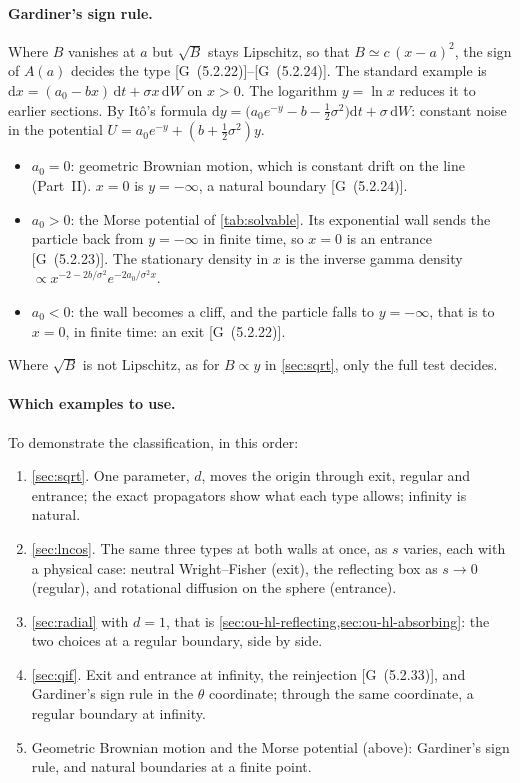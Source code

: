 \documentclass[11pt]{article}
\numberwithin{equation}{section}
\newcommand{\dd}{\mathrm{d}}
\newcommand{\G}[1]{[G~(#1)]}
\begin{document}
\paragraph{Gardiner's sign rule.} Where $B$ vanishes at $a$ but $\sqrt B$ stays Lipschitz, so that
$B\simeq c\,(x-a)^2$, the sign of $A(a)$ decides the type \G{5.2.22}--\G{5.2.24}. The standard example is
$\dd x=(a_0-bx)\,\dd t+\sigma x\,\dd W$ on $x>0$. The logarithm $y=\ln x$ reduces it to earlier sections. By Itô's
formula $\dd y=\bigl(a_0e^{-y}-b-\tfrac12\sigma^2\bigr)\dd t+\sigma\,\dd W$: constant noise in the potential
$U=a_0e^{-y}+(b+\frac12\sigma^2)y$.
\begin{itemize}
  \item $a_0=0$: geometric Brownian motion, which is constant drift on the line (Part~II). $x=0$ is $y=-\infty$, a
        natural boundary \G{5.2.24}.
  \item $a_0>0$: the Morse potential of \cref{tab:solvable}. Its exponential wall sends the particle back from
        $y=-\infty$ in finite time, so $x=0$ is an entrance \G{5.2.23}. The stationary density in $x$ is the inverse
        gamma density $\propto x^{-2-2b/\sigma^2}e^{-2a_0/\sigma^2x}$.
  \item $a_0<0$: the wall becomes a cliff, and the particle falls to $y=-\infty$, that is to $x=0$, in finite time: an
        exit \G{5.2.22}.
\end{itemize}
Where $\sqrt B$ is not Lipschitz, as for $B\propto y$ in \cref{sec:sqrt}, only the full test decides.

\paragraph{Which examples to use.} To demonstrate the classification, in this order:
\begin{enumerate}
  \item \cref{sec:sqrt}. One parameter, $d$, moves the origin through exit, regular and entrance; the exact
        propagators show what each type allows; infinity is natural.
  \item \cref{sec:lncos}. The same three types at both walls at once, as $s$ varies, each with a physical case:
        neutral Wright--Fisher (exit), the reflecting box as $s\to0$ (regular), and rotational diffusion on the sphere
        (entrance).
  \item \cref{sec:radial} with $d=1$, that is \cref{sec:ou-hl-reflecting,sec:ou-hl-absorbing}: the two choices at a
        regular boundary, side by side.
  \item \cref{sec:qif}. Exit and entrance at infinity, the reinjection \G{5.2.33}, and Gardiner's sign rule in the
        $\theta$ coordinate; through the same coordinate, a regular boundary at infinity.
  \item Geometric Brownian motion and the Morse potential (above): Gardiner's sign rule, and natural boundaries at a
        finite point.
\end{enumerate}
\end{document}

